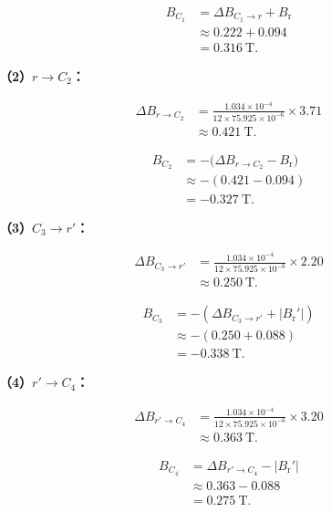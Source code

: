 \documentclass[UTF8,a4paper,12pt,fontset=none]{ctexart}
\begin{document}
\begin{align*}
B_{C_1}
&=\Delta B_{C_1\to r}+B_{\mathrm r}\\
&\approx0.222+0.094\\
&=0.316\ \mathrm T.
\end{align*}


\noindent
\textbf{（2）$r\to C_2$：}

\begin{align*}
\Delta B_{r\to C_2}
&=\frac{1.034\times10^{-4}}
{12\times75.925\times10^{-6}}
\times3.71\\
&\approx0.421\ \mathrm T.
\end{align*}

\begin{align*}
B_{C_2}
&=-\bigl(
\Delta B_{r\to C_2}-B_{\mathrm r}
\bigr)\\
&\approx-(0.421-0.094)\\
&=-0.327\ \mathrm T.
\end{align*}


\noindent
\textbf{（3）$C_3\to r'$：}

\begin{align*}
\Delta B_{C_3\to r'}
&=\frac{1.034\times10^{-4}}
{12\times75.925\times10^{-6}}
\times2.20\\
&\approx0.250\ \mathrm T.
\end{align*}

\begin{align*}
B_{C_3}
&=-\left(
\Delta B_{C_3\to r'}+|B_{\mathrm r}'|
\right)\\
&\approx-(0.250+0.088)\\
&=-0.338\ \mathrm T.
\end{align*}


\noindent
\textbf{（4）$r'\to C_4$：}

\begin{align*}
\Delta B_{r'\to C_4}
&=\frac{1.034\times10^{-4}}
{12\times75.925\times10^{-6}}
\times3.20\\
&\approx0.363\ \mathrm T.
\end{align*}

\begin{align*}
B_{C_4}
&=\Delta B_{r'\to C_4}-|B_{\mathrm r}'|\\
&\approx0.363-0.088\\
&=0.275\ \mathrm T.
\end{align*}
\end{document}
